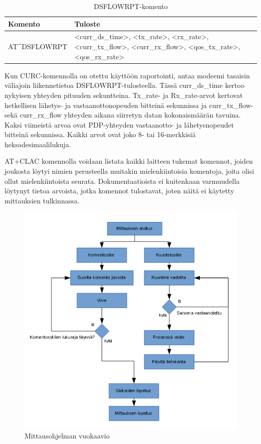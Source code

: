 \documentclass[11pt,a4paper,oneside,article,finnish]{memoir}
\begin{document}
\begin{table}[H]
	\centering
	\caption{DSFLOWRPT-komento}
	\begin{tabularx}{.95\textwidth}{|p{3cm}|X|}
		\hline
		Komento & Tuloste \\
    		\hline
		AT\^{}DSFLOWRPT & \textless curr\_ds\_time\textgreater , \textless tx\_rate\textgreater , \textless rx\_rate\textgreater , \textless curr\_tx\_flow\textgreater , \textless curr\_rx\_flow\textgreater , \textless qos\_tx\_rate\textgreater , \textless qos\_rx\_rate\textgreater \\
		\hline
	\end{tabularx}
	\label{table:atkomento_dsflowrpt}
\end{table}
Kun CURC-komennolla on otettu käyttöön raportointi, antaa modeemi tasaisin väliajoin liikennetietoa DSFLOWRPT-tulosteella. Tässä curr\_ds\_time kertoo nykyisen yhteyden pituuden sekuntteina. Tx\_rate- ja Rx\_rate-arvot kertovat hetkellisen lähetys- ja vastaanottonopeuden bitteinä sekunnissa ja curr\_tx\_flow- sekä curr\_rx\_flow yhteyden aikana siirretyn datan kokonaismäärän tavuina. Kaksi viimeistä arvoa ovat PDP-yhteyden vastaanotto- ja lähetysnopeudet bitteinä sekunnissa. Kaikki arvot ovat joko 8- tai 16-merkkisiä heksadesimaalilukuja. 

AT+CLAC komennolla voidaan listata kaikki laitteen tukemat komennot, joiden joukosta löytyi nimien perusteella muitakin mielenkiintoisia komentoja, joita olisi ollut mielenkiintoista seurata. Dokumentaatioista ei kuitenkaan varmuudella löytynyt tietoa arvoista, jotka komennot tulostavat, joten näitä ei käytetty mittauksien tulkinnassa.

\begin{figure}[H]
	\centering
	\includegraphics{mittausohjelma_flowchart}
	\caption{Mittausohjelman vuokaavio}
	\label{fig:mittausohjelma_flowchart}
\end{figure}
\end{document}
